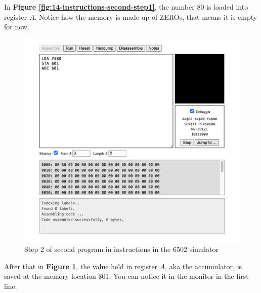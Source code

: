 \documentclass[a4paper]{article}
\begin{document}
In \textbf{Figure \ref{fig:14-instructions-second-step1}}, the number 80 is loaded into register $A$. Notice how the memory is made up of ZEROs, that means it is empty for now.

\begin{figure}[H]
    \centering
    \includegraphics[width=1.0\textwidth]{res/images/q2/15-instructions-second-step2.png}
    \caption{Step 2 of second program in instructions in the 6502 simulator}
    \label{fig:15-instructions-second-step2}
\end{figure}

After that in \textbf{Figure \ref{fig:15-instructions-second-step2}}, the value held in register $A$, aka the accumulator, is saved at the memory location $\$01$. You can notice it in the monitor in the first line.
\end{document}
